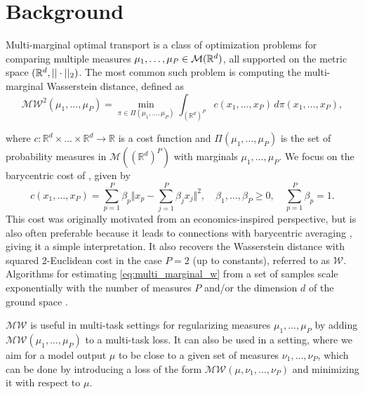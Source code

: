 \section{Background}

\label{sec:background}

Multi-marginal optimal transport \cite{gangbo} is a class of optimization problems for comparing multiple measures $\mu_1,\ldots,\mu_P \in \mathcal{M}(\mathbb{R}^d)$, all supported on the metric space $(\mathbb{R}^d,  || \cdot||_2)$. 
The most common such problem is computing the multi-marginal Wasserstein distance, defined as
\[
\label{eq:multi_marginal_w}
\mathcal{MW}^2(\mu_1,\ldots,\mu_P)=\min_{\pi \in \Pi(\mu_1,\ldots, \mu_P)} \int_{(\mathbb{R}^d)^P}  c(x_1,\ldots,x_P) \, d\pi(x_1,\ldots,x_P),
\]

where $c:\mathbb{R}^d \times\ldots\times \mathbb{R}^d \to \mathbb{R}$ is a cost function and $\Pi(\mu_1,\ldots, \mu_P)$ is the set of probability measures in $\mathcal{M}((\mathbb{R}^d)^P)$ with marginals $\mu_1, \ldots, \mu_P$.
We focus on the barycentric cost of \textcite{gangbo, journals/siamma/AguehC11}, given by
\[
c(x_1,\ldots,x_P) = \sum_{p=1}^P \beta_p \Big\Vert  x_p - \sum_{j=1}^P\beta_j x_j\Big\Vert ^2,
\quad\beta_1,\ldots,\beta_P \geq 0, \quad \sum_{p=1}^P \beta_p = 1
.
\]
This cost was originally motivated from an economics-inspired perspective, but is also often preferable because it leads to connections with barycentric averaging \cite{journals/siamma/AguehC11}, giving it a simple interpretation.
It also recovers the Wasserstein distance with squared $2$-Euclidean cost in the case $P=2$ (up to constants), referred to as $\mathcal{W}$.
Algorithms for estimating \eqref{eq:multi_marginal_w} from a set of samples  scale exponentially with the number of measures $P$ and/or the dimension $d$ of the ground space  \cite{altschuler_mm, altschulernpbary, benamou:hal-01096124}.

$\mathcal{MW}$ is useful in multi-task settings for regularizing measures $\mu_1,\ldots, \mu_P$ by adding $\mathcal{MW}(\mu_1,\ldots, \mu_P)$ to a multi-task loss. 
It can also be used in a setting, where we aim for a model output $\mu$ to be close to a given set of measures $\nu_1,\ldots, \nu_P$, which can be done by introducing a loss of the form $\mathcal{MW}(\mu, \nu_1,\ldots, \nu_P)$ and minimizing it with respect to $\mu$.



